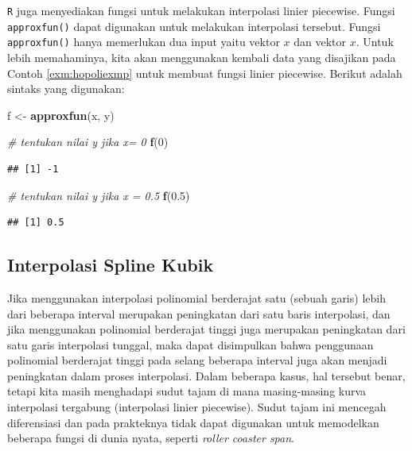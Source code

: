 \documentclass[
]{book}
\newenvironment{Shaded}{\begin{snugshade}}{\end{snugshade}}
\newcommand{\CommentTok}[1]{\textcolor[rgb]{0.56,0.35,0.01}{\textit{#1}}}
\newcommand{\DecValTok}[1]{\textcolor[rgb]{0.00,0.00,0.81}{#1}}
\newcommand{\FloatTok}[1]{\textcolor[rgb]{0.00,0.00,0.81}{#1}}
\newcommand{\FunctionTok}[1]{\textcolor[rgb]{0.13,0.29,0.53}{\textbf{#1}}}
\newcommand{\NormalTok}[1]{#1}
\newcommand{\OtherTok}[1]{\textcolor[rgb]{0.56,0.35,0.01}{#1}}
\theoremstyle{definition}
\theoremstyle{definition}
\theoremstyle{definition}
\theoremstyle{definition}
\theoremstyle{remark}
\begin{document}
\texttt{R} juga menyediakan fungsi untuk melakukan interpolasi linier piecewise. Fungsi \texttt{approxfun()} dapat digunakan untuk melakukan interpolasi tersebut. Fungsi \texttt{approxfun()} hanya memerlukan dua input yaitu vektor \(x\) dan vektor \(x\). Untuk lebih memahaminya, kita akan menggunakan kembali data yang disajikan pada Contoh \ref{exm:hopoliexmp} untuk membuat fungsi linier piecewise. Berikut adalah sintaks yang digunakan:

\begin{Shaded}
\begin{Highlighting}[]
\NormalTok{f }\OtherTok{\textless{}{-}} \FunctionTok{approxfun}\NormalTok{(x, y)}

\CommentTok{\# tentukan nilai y jika x= 0}
\FunctionTok{f}\NormalTok{(}\DecValTok{0}\NormalTok{)}
\end{Highlighting}
\end{Shaded}

\begin{verbatim}
## [1] -1
\end{verbatim}

\begin{Shaded}
\begin{Highlighting}[]
\CommentTok{\# tentukan nilai y jika x = 0.5}
\FunctionTok{f}\NormalTok{(}\FloatTok{0.5}\NormalTok{)}
\end{Highlighting}
\end{Shaded}

\begin{verbatim}
## [1] 0.5
\end{verbatim}

\hypertarget{cubicspline}{%
\subsection{Interpolasi Spline Kubik}\label{cubicspline}}

Jika menggunakan interpolasi polinomial berderajat satu (sebuah garis) lebih dari beberapa interval merupakan peningkatan dari satu baris interpolasi, dan jika menggunakan polinomial berderajat tinggi juga merupakan peningkatan dari satu garis interpolasi tunggal, maka dapat disimpulkan bahwa penggunaan polinomial berderajat tinggi pada selang beberapa interval juga akan menjadi peningkatan dalam proses interpolasi. Dalam beberapa kasus, hal tersebut benar, tetapi kita masih menghadapi sudut tajam di mana masing-masing kurva interpolasi tergabung (interpolasi linier piecewise). Sudut tajam ini mencegah diferensiasi dan pada prakteknya tidak dapat digunakan untuk memodelkan beberapa fungsi di dunia nyata, seperti \emph{roller coaster span}.
\end{document}
